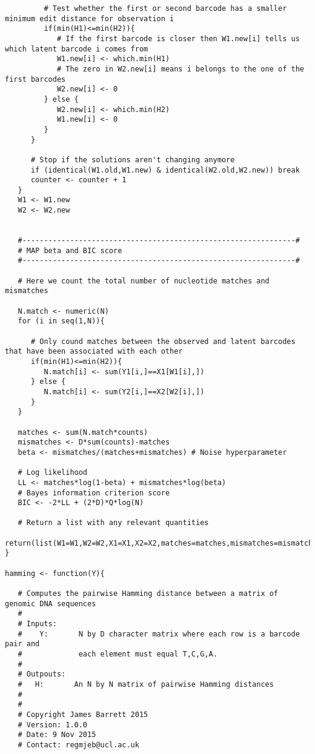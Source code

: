 \begin{footnotesize}
\begin{lstlisting}
         # Test whether the first or second barcode has a smaller minimum edit distance for observation i
         if(min(H1)<=min(H2)){
            # If the first barcode is closer then W1.new[i] tells us which latent barcode i comes from
            W1.new[i] <- which.min(H1)   
            # The zero in W2.new[i] means i belongs to the one of the first barcodes
            W2.new[i] <- 0
         } else {
            W2.new[i] <- which.min(H2)   
            W1.new[i] <- 0
         }
      }
      
      # Stop if the solutions aren't changing anymore
      if (identical(W1.old,W1.new) & identical(W2.old,W2.new)) break
      counter <- counter + 1
   }
   W1 <- W1.new
   W2 <- W2.new
   
   
   #---------------------------------------------------------------#
   # MAP beta and BIC score
   #---------------------------------------------------------------#
   
   # Here we count the total number of nucleotide matches and mismatches
   
   N.match <- numeric(N)
   for (i in seq(1,N)){
      
      # Only cound matches between the observed and latent barcodes that have been associated with each other
      if(min(H1)<=min(H2)){
         N.match[i] <- sum(Y1[i,]==X1[W1[i],])   
      } else {
         N.match[i] <- sum(Y2[i,]==X2[W2[i],])
      }
   }
   
   matches <- sum(N.match*counts)
   mismatches <- D*sum(counts)-matches
   beta <- mismatches/(matches+mismatches) # Noise hyperparameter
   
   # Log likelihood
   LL <- matches*log(1-beta) + mismatches*log(beta)
   # Bayes information criterion score
   BIC <- -2*LL + (2*D)*Q*log(N)
   
   # Return a list with any relevant quantities
   return(list(W1=W1,W2=W2,X1=X1,X2=X2,matches=matches,mismatches=mismatches,beta=beta,BIC=BIC))
}

hamming <- function(Y){

   # Computes the pairwise Hamming distance between a matrix of genomic DNA sequences
   #
   # Inputs:
   #    Y:       N by D character matrix where each row is a barcode pair and 
   #             each element must equal T,C,G,A.
   #
   # Outpouts:
   #   H:       An N by N matrix of pairwise Hamming distances
   #
   #
   # Copyright James Barrett 2015
   # Version: 1.0.0
   # Date: 9 Nov 2015
   # Contact: regmjeb@ucl.ac.uk
   

\end{lstlisting}
\end{footnotesize}
